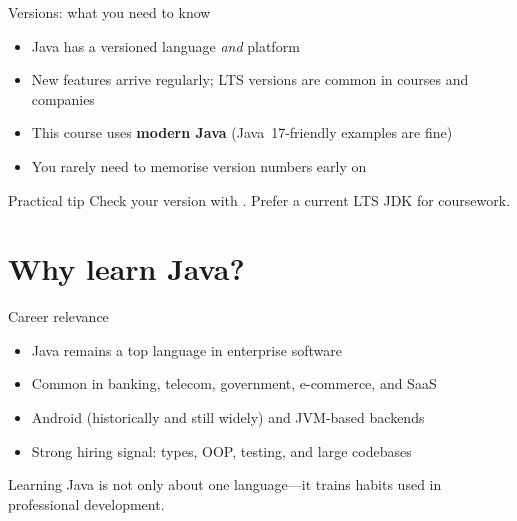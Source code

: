 \documentclass[aspectratio=169,11pt]{beamer}
\begin{document}
    \begin{frame}{Versions: what you need to know}
        \begin{itemize}
            \item Java has a versioned language \emph{and} platform
            \item New features arrive regularly; LTS versions are common in courses and companies
            \item This course uses \textbf{modern Java} (Java~17-friendly examples are fine)
            \item You rarely need to memorise version numbers early on
        \end{itemize}
        \vspace{0.6em}
        \begin{block}{Practical tip}
            Check your version with .
            Prefer a current LTS JDK for coursework.
        \end{block}
    \end{frame}

    \section{Why learn Java?}

    \begin{frame}{Career relevance}
        \begin{itemize}
            \item Java remains a top language in enterprise software
            \item Common in banking, telecom, government, e-commerce, and SaaS
            \item Android (historically and still widely) and JVM-based backends
            \item Strong hiring signal: types, OOP, testing, and large codebases
        \end{itemize}
        \vspace{0.6em}
        Learning Java is not only about one language---it trains habits used in
        professional development.
    \end{frame}
\end{document}
